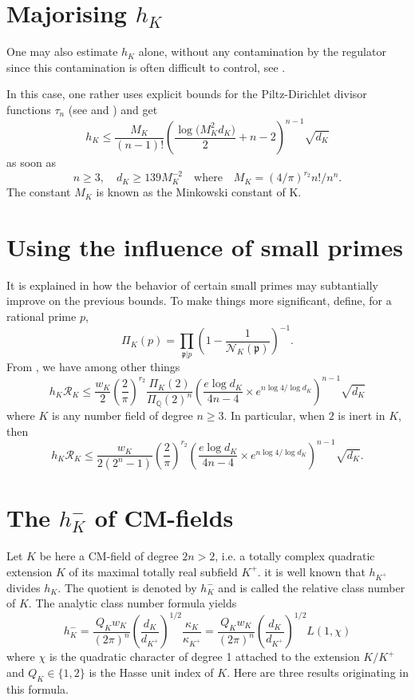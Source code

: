 \section{Majorising $h_K$}



One may also estimate $h_K$ alone, without any contamination by the regulator
since this contamination is often difficult to control,
see \cite{Pohst-Zassenhaus*89}.

In this case, one
rather uses explicit bounds for the Piltz-Dirichlet divisor functions $\tau_n$
(see \cite{Bordelles*02}
and \cite{Bordelles*06})
and get
$$
h_K\le \frac{M_K}{(n-1)!}
\left(\frac{\log\bigl(M^2_Kd_K\bigr)}{2}+n-2\right)^{n-1}
\sqrt{d_K}
$$
as soon as
$$
n\ge 3,\quad d_K\ge 139 M_K^{-2}
\quad\text{where}\quad
M_K=(4/\pi)^{r_2}n!/n^n.
$$
The constant $M_K$ is known as the Minkowski constant of K.



\section{Using the influence of small primes}



It is explained in
\cite{Louboutin*05} how the
behavior of certain small primes may subtantially improve on the previous
bounds. To make things more significant, define, for a rational prime $p$,
$$
\Pi_K(p)=\prod_{\mathfrak{p}|p}\left(1-\frac{1}{\mathcal{N}_K(\mathfrak{p})}\right)^{-1}.
$$
From \cite{Louboutin*05}, we have
among other things
$$
h_K\mathcal{R}_K
\le\frac{w_K}{2}
\left(\frac{2}{\pi}\right)^{r_2}
\frac{\Pi_K(2)}{\Pi_{\mathbb{Q}}(2)^n}
\left(\frac{e\log d_K}{4n-4}\times
e^{n\log 4/\log d_K}
\right)^{n-1}\sqrt{d_K}
$$
where $K$ is any number field of degree $n\ge3$. In particular, when $2$ is
inert in $K$, then
$$
h_K\mathcal{R}_K
\le\frac{w_K}{2(2^n-1)}
\left(\frac{2}{\pi}\right)^{r_2}
\left(\frac{e\log d_K}{4n-4}\times
e^{n\log 4/\log d_K}
\right)^{n-1}\sqrt{d_K}.
$$




\section{The $h^-_K$ of CM-fields}



Let $K$ be here a CM-field of degree $2n > 2$, i.e. a totally complex
quadratic extension $K$ of its maximal totally real subfield $K^+$. it is well
known that $h_{K^+}$ divides $h_K$. The quotient is denoted by $h^-_K$ and is
called the relative class number of $K$. The analytic class number
formula yields
$$
h^-_K=\frac{Q_Kw_K}{(2\pi)^n}
\left(\frac{d_K}{d_{K^+}}\right)^{1/2}
\frac{\kappa_K}{\kappa_{K^+}}
=
\frac{Q_Kw_K}{(2\pi)^n}
\left(\frac{d_K}{d_{K^+}}\right)^{1/2}
L(1,\chi)
$$
where $\chi$ is the quadratic character of degree 1 attached to the extension
$K/K^+$ and $Q_K\in\{1,2\}$ is the Hasse unit index of $K$.
Here are three results originating in this formula.

